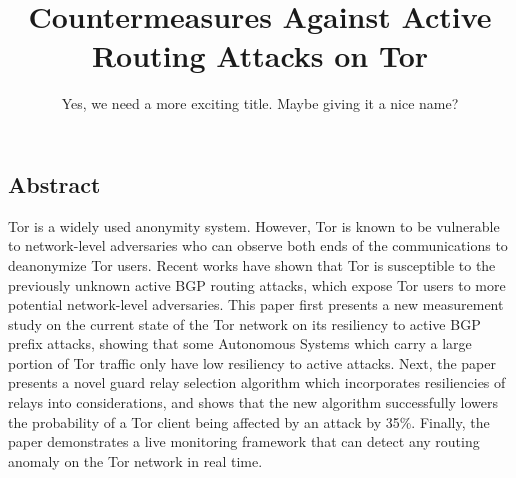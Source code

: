 \documentclass[letterpaper,twocolumn,10pt]{article}
\begin{document}
\date{}

\title{\Large \bf Countermeasures Against Active Routing Attacks on Tor}
\author{Yes, we need a more exciting title. Maybe giving it a nice name?}


\maketitle

\thispagestyle{empty}

\subsection*{Abstract}
Tor is a widely used anonymity system. However, Tor is known to be vulnerable to 
network-level adversaries who can observe both ends of the communications to deanonymize Tor users. Recent works have shown that Tor is susceptible to the previously unknown active BGP routing attacks, which expose Tor users to more potential network-level adversaries. This paper first presents a new measurement study on the current state of the Tor network on its resiliency to active BGP prefix attacks, showing that some Autonomous Systems which carry a large portion of Tor traffic only have low resiliency to active attacks. Next, the paper presents a novel guard relay selection algorithm which incorporates resiliencies of relays into considerations, and shows that the new algorithm successfully lowers the probability of a Tor client being affected by an attack by 35\%. Finally, the paper demonstrates a live monitoring framework that can detect any routing anomaly on the Tor network in real time. 








%
%


{\footnotesize 
}

\end{document}
